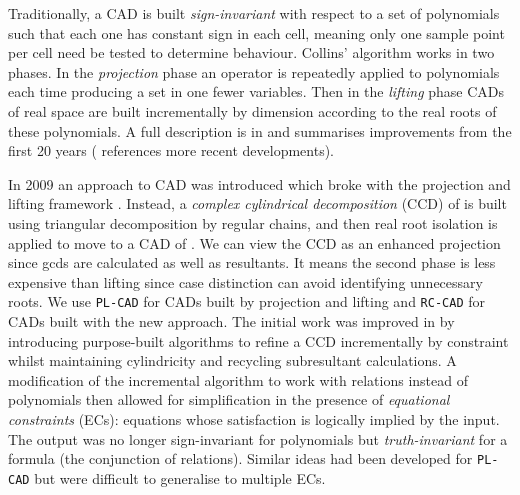 \documentclass[runningheads,a4paper]{llncs}
\begin{document}
\vspace*{10pt}

Traditionally, a CAD is built \textit{sign-invariant} with respect to a set of polynomials such that each one has constant sign in each cell, meaning only one sample point per cell need be tested to determine behaviour.  Collins' algorithm works in two phases.  In the \textit{projection} phase an operator is repeatedly applied to polynomials each time producing a set in one fewer variables.  Then in the \textit{lifting} phase CADs of real space are built incrementally by dimension according to the real roots of these polynomials.
A full description is in \cite{ACM84I} and \cite{Collins1998} summarises improvements from the first 20 years (\cite{BDEMW13} references more recent developments).

In 2009 an approach to CAD was introduced which broke with the projection and lifting framework \cite{CMXY09}.  Instead, a \emph{complex cylindrical decomposition} (CCD) of  is built using triangular decomposition by regular chains, and then real root isolation is applied to move to a CAD of .  
We can view the CCD as an enhanced projection since gcds are calculated as well as resultants. It means the second phase is less expensive than lifting since case distinction can avoid identifying unnecessary roots.
We use \texttt{PL-CAD} for CADs built by projection and lifting and \texttt{RC-CAD} for CADs built with the new approach.
The initial work was improved in \cite{CM12b} by introducing purpose-built algorithms to refine a CCD incrementally by constraint whilst maintaining cylindricity and recycling subresultant calculations.  
A modification of the incremental algorithm to work with relations instead of polynomials then allowed for simplification in the presence of \emph{equational constraints} (ECs): equations whose satisfaction is logically implied by the input.  
The output was no longer sign-invariant for polynomials but \textit{truth-invariant} for a formula (the conjunction of relations).  Similar ideas had been developed for \texttt{PL-CAD} \cite{McCallum1999} but were difficult to generalise to multiple ECs.
\end{document}
